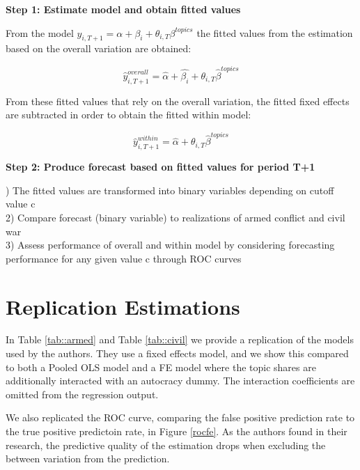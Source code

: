 \noindent\textbf{Step 1: Estimate model and obtain fitted values}

\noindent From the model $y_{i,T+1} = \alpha + \beta_{i} + \theta_{i,T}\beta^{topics}$ the fitted values from the estimation based on the overall variation are obtained: 

\begin{equation}
    \hat{y}_{i,T+1}^{overall} = \hat{\alpha} + \hat{\beta_i} + \theta_{i,T}\hat{\beta}^{topics}
\end{equation}

\noindent From these fitted values that rely on the overall variation, the fitted fixed effects are subtracted in order to obtain the fitted within model:

\begin{equation}
    \hat{y}_{i,T+1}^{within} = \hat{\alpha} + \theta_{i,T}\hat{\beta}^{topics}
\end{equation}

\noindent \textbf{Step 2: Produce forecast based on fitted values for period T+1}

) The fitted values are transformed into binary variables depending on cutoff value c\\
2) Compare forecast (binary variable) to realizations of armed conflict and civil war\\
3) Assess performance of overall and within model by considering forecasting performance for any given value c through ROC curves 

\section{Replication Estimations}
In Table \ref{tab::armed} and Table \ref{tab::civil} we provide a replication of the models used by the authors. They use a fixed effects model, and we show this compared to both a Pooled OLS model and a FE model where the topic shares are additionally interacted with an autocracy dummy. The interaction coefficients are omitted from the regression output.

We also replicated the ROC curve, comparing the false positive prediction rate to the true positive predictoin rate, in Figure \ref{rocfe}. As the authors found in their research, the predictive quality of the estimation drops when excluding the between variation from the prediction.

